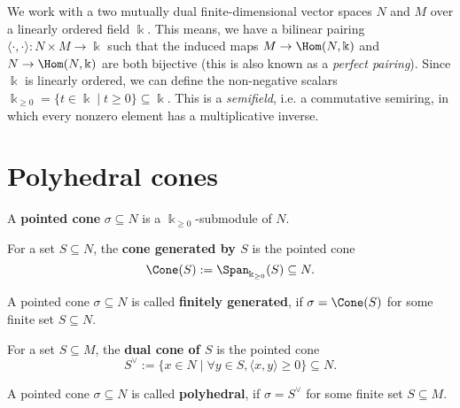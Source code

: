 We work with a two mutually dual finite-dimensional vector spaces \( N
\) and \( M \) over a linearly ordered field \( \Bbbk \). This means,
we have a bilinear pairing \( \langle \cdot, \cdot \rangle \colon N
\times M \to \Bbbk \) such that the induced maps \( M \to
\Hom(N,\Bbbk) \) and \( N \to \Hom(N,\Bbbk) \) are both bijective
(this is also known as a \emph{perfect pairing}). Since \( \Bbbk \) is
linearly ordered, we can define the non-negative scalars \(\Bbbk_{\geq
0} = \{t \in \Bbbk \mid t \geq 0 \} \subseteq \Bbbk\). This is a
\emph{semifield}, i.e. a commutative semiring, in which every nonzero
element has a multiplicative inverse.

\section{Polyhedral cones}

\begin{definition}
  \label{3-pointed-cone}
  \uses{}
  \leanok
  A {\bf pointed cone} \( \sigma \subseteq N \) is a \( \Bbbk_{\geq 0}
  \)-submodule of \( N \).
\end{definition}

\begin{definition}
  \label{3-cone-span}
  \leanok
  For a set \( S \subseteq N \), the {\bf cone generated by \( S \)}
  is the pointed cone
  \[
      \Cone(S) := \Span_{\Bbbk_{\geq 0}}(S) \subseteq N.
  \]
\end{definition}

\begin{definition}
  \label{3-cone-finitely-generated}
  \leanok
  A pointed cone \( \sigma \subseteq N \) is called {\bf finitely
  generated}, if \( \sigma = \Cone(S) \) for some finite set \( S
  \subseteq N \).
\end{definition}

\begin{definition}
  \label{3-dual-cone}
  \leanok
  For a set \( S \subseteq M \), the {\bf dual cone of \( S \)} is
  the pointed cone
  \[
      S^\vee := \{x \in N \mid \forall y \in S, \langle x, y \rangle
      \geq 0 \} \subseteq N.
  \]
\end{definition}

\begin{definition}
  \label{3-polyhedral-cone}
  \leanok
  A pointed cone \( \sigma \subseteq N \) is called {\bf polyhedral},
  if \( \sigma = S^\vee \) for some finite set \( S \subseteq M \).
\end{definition}

